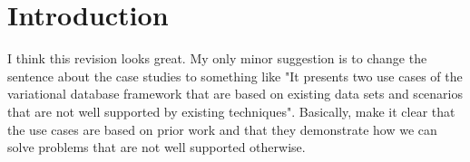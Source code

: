 \chapter{Introduction}
\label{ch:intro}





%


I think this revision looks great. My only minor suggestion is to change the sentence about the case studies to something like "It presents two use cases of the variational database framework that are based on existing data sets and scenarios that are not well supported by existing techniques". Basically, make it clear that the use cases are based on prior work and that they demonstrate how we can solve problems that are not well supported otherwise.